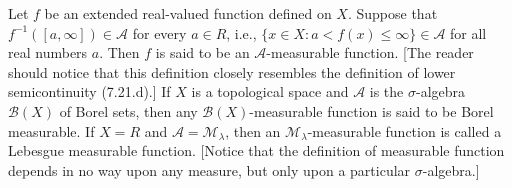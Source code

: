 Let $f$ be an extended real-valued function defined on $X$. Suppose that $f^{-1}([a, \infty]) \in \mathcal{A}$ for every $a \in R$, i.e., $\{x \in X : a < f(x) \leq \infty\} \in \mathcal{A}$ for all real numbers $a$. Then $f$ is said to be an $\mathcal{A}$-measurable function. [The reader should notice that this definition closely resembles the definition of lower semicontinuity (7.21.d).] If $X$ is a topological space and $\mathcal{A}$ is the $\sigma$-algebra $\mathcal{B}(X)$ of Borel sets, then any $\mathcal{B}(X)$-measurable function is said to be Borel measurable. If $X = R$ and $\mathcal{A} = \mathcal{M}_{\lambda}$, then an $\mathcal{M}_{\lambda}$-measurable function is called a Lebesgue measurable function. [Notice that the definition of measurable function depends in no way upon any measure, but only upon a particular $\sigma$-algebra.]
